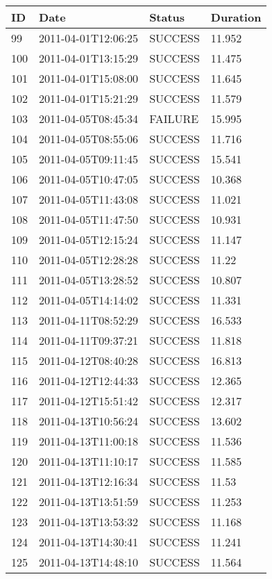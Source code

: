 \begin{tabularx}{\textwidth}{p{1cm} p{3cm} p{2cm} X}
 \toprule
 \textbf{ID} & \textbf{Date} & \textbf{Status} & \textbf{Duration} \\ 
 \toprule
 99 & 2011-04-01T12:06:25 & SUCCESS & 11.952 \\
 100 & 2011-04-01T13:15:29 & SUCCESS & 11.475 \\
 101 & 2011-04-01T15:08:00 & SUCCESS & 11.645 \\
 102 & 2011-04-01T15:21:29 & SUCCESS & 11.579 \\
 103 & 2011-04-05T08:45:34 & FAILURE & 15.995 \\
 104 & 2011-04-05T08:55:06 & SUCCESS & 11.716 \\
 105 & 2011-04-05T09:11:45 & SUCCESS & 15.541 \\
 106 & 2011-04-05T10:47:05 & SUCCESS & 10.368 \\
 107 & 2011-04-05T11:43:08 & SUCCESS & 11.021 \\
 108 & 2011-04-05T11:47:50 & SUCCESS & 10.931 \\
 109 & 2011-04-05T12:15:24 & SUCCESS & 11.147 \\
 110 & 2011-04-05T12:28:28 & SUCCESS & 11.22 \\
 111 & 2011-04-05T13:28:52 & SUCCESS & 10.807 \\
 112 & 2011-04-05T14:14:02 & SUCCESS & 11.331 \\
 113 & 2011-04-11T08:52:29 & SUCCESS & 16.533 \\
 114 & 2011-04-11T09:37:21 & SUCCESS & 11.818 \\
 115 & 2011-04-12T08:40:28 & SUCCESS & 16.813 \\
 116 & 2011-04-12T12:44:33 & SUCCESS & 12.365 \\
 117 & 2011-04-12T15:51:42 & SUCCESS & 12.317 \\
 118 & 2011-04-13T10:56:24 & SUCCESS & 13.602 \\
 119 & 2011-04-13T11:00:18 & SUCCESS & 11.536 \\
 120 & 2011-04-13T11:10:17 & SUCCESS & 11.585 \\
 121 & 2011-04-13T12:16:34 & SUCCESS & 11.53 \\
 122 & 2011-04-13T13:51:59 & SUCCESS & 11.253 \\
 123 & 2011-04-13T13:53:32 & SUCCESS & 11.168 \\
 124 & 2011-04-13T14:30:41 & SUCCESS & 11.241 \\
 125 & 2011-04-13T14:48:10 & SUCCESS & 11.564 \\

\end{tabularx}

